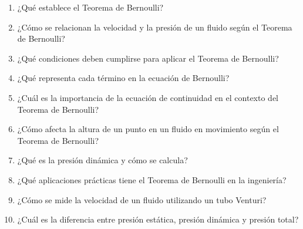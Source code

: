 \documentclass[../main]{subfiles}
\begin{document}
\begin{enumerate}
\item ¿Qué establece el Teorema de Bernoulli?
\item ¿Cómo se relacionan la velocidad y la presión de un fluido según el Teorema de Bernoulli?
\item ¿Qué condiciones deben cumplirse para aplicar el Teorema de Bernoulli?
\item ¿Qué representa cada término en la ecuación de Bernoulli?
\item ¿Cuál es la importancia de la ecuación de continuidad en el contexto del Teorema de Bernoulli?
\item ¿Cómo afecta la altura de un punto en un fluido en movimiento según el Teorema de Bernoulli?
\item ¿Qué es la presión dinámica y cómo se calcula?
\item ¿Qué aplicaciones prácticas tiene el Teorema de Bernoulli en la ingeniería?
\item ¿Cómo se mide la velocidad de un fluido utilizando un tubo Venturi?
\item ¿Cuál es la diferencia entre presión estática, presión dinámica y presión total?
\end{enumerate}
\end{document}
